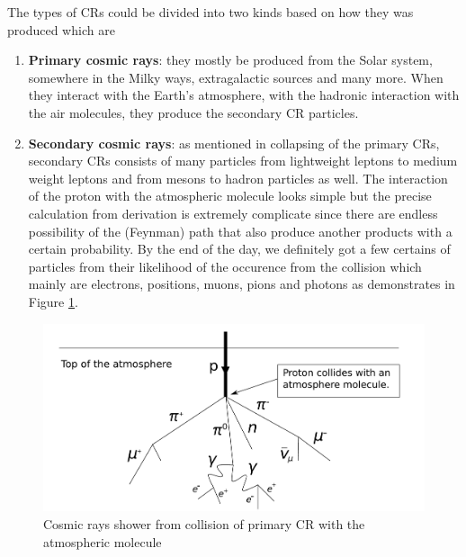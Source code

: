 The types of CRs could be divided into two kinds based on
how they was produced which are
\begin{enumerate}
    \item \textbf{Primary cosmic rays}: they mostly be produced from the
    Solar system, somewhere in the Milky ways, extragalactic sources
    and many more. When they interact with the Earth's atmosphere,
    with the hadronic interaction with the air molecules,
    they produce the secondary CR particles.
    \item \textbf{Secondary cosmic rays}: as mentioned in collapsing of the  
    primary CRs, secondary CRs consists of many particles
    from lightweight leptons to medium weight leptons and 
    from mesons to hadron particles as well. The interaction
    of the proton with the atmospheric molecule looks simple 
    but the precise calculation from derivation is extremely complicate 
    since there are endless possibility of the (Feynman) path that 
    also produce another products with a certain probability.
    By the end of the day, we definitely got a few certains 
    of particles from their likelihood of the occurence from 
    the collision which mainly are electrons, positions, muons,
    pions and photons as demonstrates in Figure \ref{fig:cr_shower}.
\end{enumerate}

\begin{figure}[h]
    \centering
    \includegraphics[width=\textwidth]{content/background/figures/Atmospheric_Collision.pdf}
    \caption{Cosmic rays shower from collision of primary CR with the atmospheric molecule
    }
    \label{fig:cr_shower}
\end{figure}


